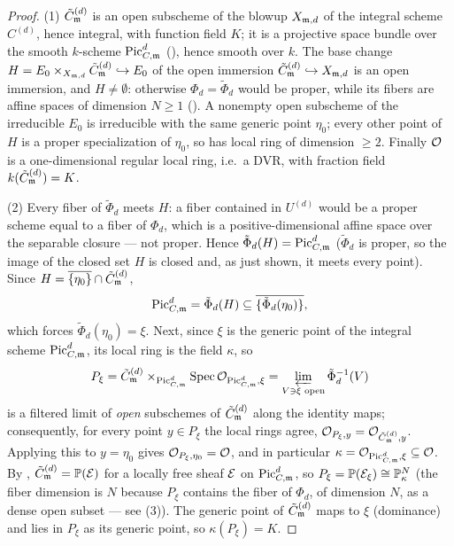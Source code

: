 \begin{proof}
    (1) $\Cmod{d}$ is an open subscheme of the blowup $X_{\mdls,d}$ of the integral scheme
    $C^{(d)}$, hence integral, with function field $K$; it is a projective space bundle over
    the smooth $k$-scheme $\PicCm[d]$ (),
    hence smooth over $k$. The base change
    $H = E_0 \times_{X_{\mdls,d}} \Cmod{d} \hookrightarrow E_0$ of the open immersion
    $\Cmod{d} \hookrightarrow X_{\mdls,d}$ is an open immersion, and $H \neq \emptyset$:
    otherwise $\Phi_d = \tilde{\Phi}_d$ would be proper, while its fibers are affine spaces
    of dimension $N \geq 1$ (). A nonempty open subscheme of the
    irreducible $E_0$ is irreducible with the same generic point $\eta_0$; every other point
    of $H$ is a proper specialization of $\eta_0$, so has local ring of dimension $\geq 2$.
    Finally $\Oo$ is a one-dimensional regular local ring, i.e.\ a DVR, with fraction field
    $k(\Cmod{d}) = K$.

    (2) Every fiber of $\tilde{\Phi}_d$ meets $H$: a fiber contained in $U^{(d)}$ would be a
    proper scheme equal to a fiber of $\Phi_d$, which is a positive-dimensional affine space
    over the separable closure --- not proper. Hence $\tilde{\Phi}_d(H) = \PicCm[d]$
    ($\tilde{\Phi}_d$ is proper, so the image of the closed set $H$ is closed and, as just
    shown, it meets every point). Since $H = \overline{\{\eta_0\}} \cap \Cmod{d}$,
    \[
    \PicCm[d] = \tilde{\Phi}_d(H) \subseteq
    \overline{\{\tilde{\Phi}_d(\eta_0)\}},
    \]
    which forces $\tilde{\Phi}_d(\eta_0) = \xi$. Next, since $\xi$ is the generic point of
    the integral scheme $\PicCm[d]$, its local ring is the field $\kappa$, so
    \[
    P_\xi = \Cmod{d} \times_{\PicCm[d]} \Spec \Oo_{\PicCm[d], \xi}
          = \varprojlim_{V \ni \xi \text{ open}} \tilde{\Phi}_d^{-1}(V)
    \]
    is a filtered limit of \emph{open} subschemes of $\Cmod{d}$ along the identity maps;
    consequently, for every point $y \in P_\xi$ the local rings agree,
    $\Oo_{P_\xi, y} = \Oo_{\Cmod{d}, y}$. Applying this to $y = \eta_0$ gives
    $\Oo_{P_\xi,\eta_0} = \Oo$, and in particular $\kappa = \Oo_{\PicCm[d],\xi} \subseteq \Oo$.
    By , $\Cmod{d} = \bP(\cE)$ for a locally
    free sheaf $\cE$ on $\PicCm[d]$, so $P_\xi = \bP(\cE_\xi) \cong \bP^{N}_\kappa$ (the
    fiber dimension is $N$ because $P_\xi$ contains the fiber of $\Phi_d$, of dimension $N$,
    as a dense open subset --- see (3)). The generic point of $\Cmod{d}$ maps to $\xi$
    (dominance) and lies in $P_\xi$ as its generic point, so $\kappa(P_\xi) = K$.


\end{proof}
